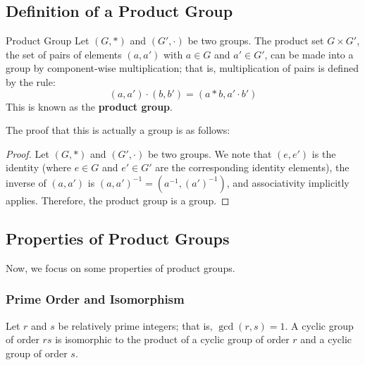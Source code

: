 \documentclass[letterpaper]{article}
\begin{document}
\subsection{Definition of a Product Group}
\begin{definition}{Product Group}{}
    Let $(G, *)$ and $(G', \cdot)$ be two groups. The product set $G \times G'$, the set of pairs of elements $(a, a')$ with $a \in G$ and $a' \in G'$, can be made into a group by component-wise multiplication; that is, multiplication of pairs is defined by the rule: 
    \[(a, a') \cdot (b, b') = (a * b, a' \cdot b')\]
    This is known as the \textbf{product group}.
\end{definition}
The proof that this is actually a group is as follows:
\begin{mdframed}
    \begin{proof}
        Let $(G, *)$ and $(G', \cdot)$ be two groups. We note that $(e, e')$ is the identity (where $e \in G$ and $e' \in G'$ are the corresponding identity elements), the inverse of $(a, a')$ is $(a, a')^{-1} = (a^{-1}, (a')^{-1})$, and associativity implicitly applies. Therefore, the product group is a group. 
    \end{proof}
\end{mdframed}

\subsection{Properties of Product Groups}
Now, we focus on some properties of product groups. 

\subsubsection{Prime Order and Isomorphism}
\begin{mdframed}
    \begin{proposition}
        Let $r$ and $s$ be relatively prime integers; that is, $\gcd(r, s) = 1$. A cyclic group of order $rs$ is isomorphic to the product of a cyclic group of order $r$ and a cyclic group of order $s$. 
    \end{proposition}
\end{mdframed}
\end{document}
